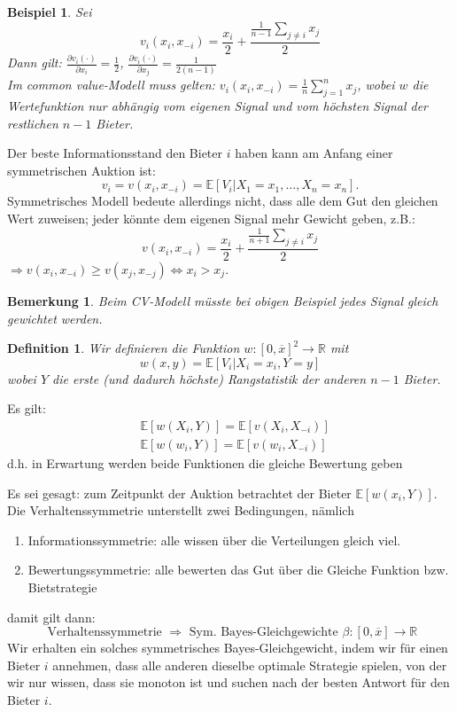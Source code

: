 \documentclass[12pt]{extreport} %
\newcommand{\R}{\mathbb{R}}
\theoremstyle{named}
\theoremstyle{itshape}
\newtheorem*{definition}{Definition}
\theoremstyle{normal}
\newtheorem{beispiel}[unnamedtheorem]{Beispiel}
\newtheorem*{bemerkung}{Bemerkung}
\begin{document}
\begin{beispiel} Sei
	$$ v_{i}(x_{i}, x_{-i}) = \frac{x_{i}}{2} + \frac{\frac{1}{n-1} \sum_{j \neq i} x_{j}}{2}$$
	Dann gilt: $\frac{\partial v_{i}(\cdot)}{\partial x_{i}} = \frac{1}{2}$, $\frac{\partial v_{i}(\cdot)}{\partial x_{j}} = \frac{1}{2(n-1)}$ ~\\
					
	Im common value-Modell muss gelten: $v_{i}(x_{i}, x_{-i}) = \frac{1}{n} \sum_{j=1}^{n} x_{j}$, wobei $w$ die Wertefunktion nur abhängig vom eigenen Signal und vom höchsten Signal der restlichen $n-1$ Bieter.
\end{beispiel}	


Der beste Informationsstand den Bieter $i$ haben kann am Anfang einer symmetrischen Auktion ist:
	$$ v_{i} = v(x_{i}, x_{-i}) = \mathds{E}\left[V_{i} \big| X_1 = x_1, \dotsc, X_n = x_n \right]. $$
Symmetrisches Modell bedeute allerdings nicht, dass alle dem Gut den gleichen Wert zuweisen; jeder könnte dem eigenen Signal mehr Gewicht geben, z.B.:
$$ v(x_i, x_{-i}) = \frac{x_{i}}{2} + \frac{\frac{1}{n+1}\sum_{j \neq i} x_{j}}{2} $$
$\Rightarrow v(x_{i}, x_{-i}) \geq v(x_{j}, x_{-j}) \iff x_{i} > x_{j}$. 

\begin{bemerkung}
	Beim CV-Modell müsste bei obigen Beispiel jedes Signal gleich gewichtet werden.	
\end{bemerkung}

\begin{definition}
	Wir definieren die Funktion $w \colon [0, \overline{x}]^{2} \rightarrow \R$ mit
	$$ w(x,y) = \mathds{E}\left[ V_{i} \big| X_{i} = x_{i}, Y = y \right] $$
	wobei $Y$ die erste (und dadurch höchste) Rangstatistik der anderen $n-1$ Bieter.
\end{definition}

Es gilt: 
\begin{eqnarray*}
	& \mathds{E}[w(X_{i}, Y)]  =  \mathds{E}[v(X_{i}, X_{-i})] \\
	& \mathds{E}[w(w_{i}, Y)]  =  \mathds{E}[v(w_{i}, X_{-i})] 
\end{eqnarray*}
d.h. in Erwartung werden beide Funktionen die gleiche Bewertung geben 

Es sei gesagt: zum Zeitpunkt der Auktion betrachtet der Bieter $\mathds{E}\left[ w(x_i, Y) \right]$. ~\\


Die Verhaltenssymmetrie unterstellt zwei Bedingungen, nämlich
\begin{enumerate}
	\item Informationssymmetrie: alle wissen über die Verteilungen gleich viel.
	\item  Bewertungssymmetrie: alle bewerten das Gut über die Gleiche Funktion bzw. Bietstrategie
\end{enumerate}
damit gilt dann:
$$ \text{ Verhaltenssymmetrie } \Rightarrow \text{ Sym. Bayes-Gleichgewichte } \beta \colon [0, \overline{x}] \rightarrow \R $$ 
Wir erhalten ein solches symmetrisches Bayes-Gleichgewicht, indem wir für einen Bieter $i$ annehmen, dass alle anderen dieselbe optimale Strategie spielen, von der wir nur wissen, dass sie monoton ist und suchen nach der besten Antwort für den Bieter $i$. ~\\
\end{document}
